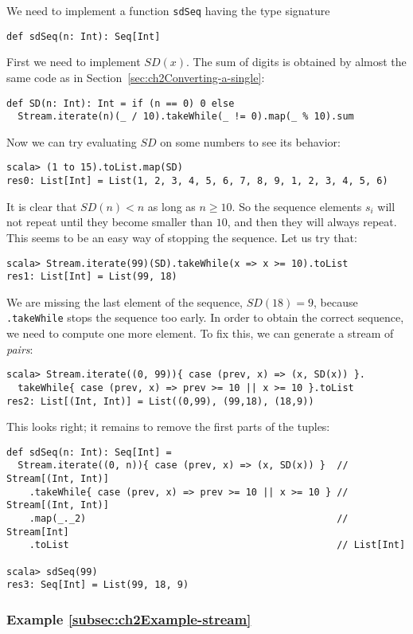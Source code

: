 We need to implement a function \lstinline!sdSeq! having the type
signature
\begin{lstlisting}
def sdSeq(n: Int): Seq[Int]
\end{lstlisting}
First we need to implement $SD(x)$. The sum of digits is obtained
by almost the same code as in Section~\ref{sec:ch2Converting-a-single}:
\begin{lstlisting}
def SD(n: Int): Int = if (n == 0) 0 else
  Stream.iterate(n)(_ / 10).takeWhile(_ != 0).map(_ % 10).sum
\end{lstlisting}
Now we can try evaluating $SD$ on some numbers to see its behavior:
\begin{lstlisting}
scala> (1 to 15).toList.map(SD)
res0: List[Int] = List(1, 2, 3, 4, 5, 6, 7, 8, 9, 1, 2, 3, 4, 5, 6)
\end{lstlisting}
It is clear that $SD(n)<n$ as long as $n\geq10$. So the sequence
elements $s_{i}$ will not repeat until they become smaller than $10$,
and then they will always repeat. This seems to be an easy way of
stopping the sequence. Let us try that:
\begin{lstlisting}
scala> Stream.iterate(99)(SD).takeWhile(x => x >= 10).toList
res1: List[Int] = List(99, 18)
\end{lstlisting}
We are missing the last element of the sequence, $SD(18)=9$, because
\lstinline!.takeWhile! stops the sequence too early. In order to
obtain the correct sequence, we need to compute one more element.
To fix this, we can generate a stream of \emph{pairs}:
\begin{lstlisting}
scala> Stream.iterate((0, 99)){ case (prev, x) => (x, SD(x)) }.
  takeWhile{ case (prev, x) => prev >= 10 || x >= 10 }.toList
res2: List[(Int, Int)] = List((0,99), (99,18), (18,9))
\end{lstlisting}
This looks right; it remains to remove the first parts of the tuples:
\begin{lstlisting}
def sdSeq(n: Int): Seq[Int] =
  Stream.iterate((0, n)){ case (prev, x) => (x, SD(x)) }  // Stream[(Int, Int)]
    .takeWhile{ case (prev, x) => prev >= 10 || x >= 10 } // Stream[(Int, Int)]
    .map(_._2)                                            // Stream[Int]
    .toList                                               // List[Int]

scala> sdSeq(99)
res3: Seq[Int] = List(99, 18, 9)
\end{lstlisting}


\subsubsection{Example \label{subsec:ch2Example-stream}\ref{subsec:ch2Example-stream}}

